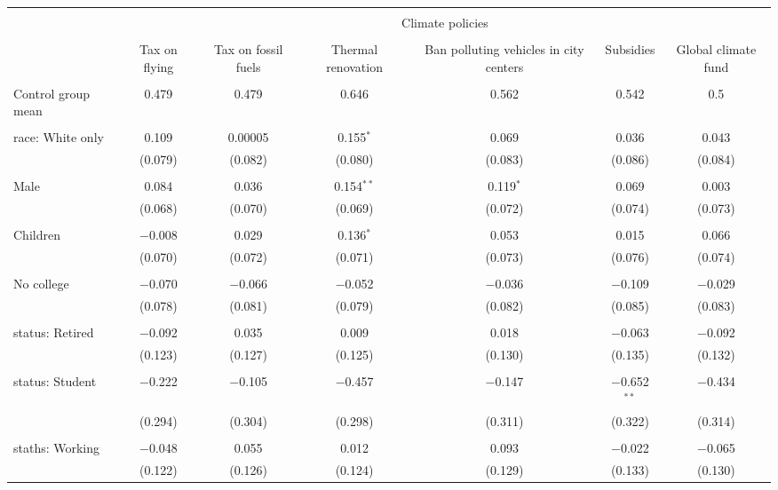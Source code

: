
\begin{tabular}{@{\extracolsep{5pt}}lcccccc} 
\\[-1.8ex]\hline 
\hline \\[-1.8ex] 
 & \multicolumn{6}{c}{Climate policies} \\ 
\cline{2-7} 
\\[-1.8ex] & Tax on flying & Tax on fossil fuels & Thermal renovation & Ban polluting vehicles in city centers & Subsidies & Global climate fund \\ 
\hline \\[-1.8ex] 
 Control group mean & 0.479 & 0.479 & 0.646 & 0.562 & 0.542 & 0.5  \\ \hline \\[-1.8ex] race: White only & 0.109 & 0.00005 & 0.155$^{*}$ & 0.069 & 0.036 & 0.043 \\ 
  & (0.079) & (0.082) & (0.080) & (0.083) & (0.086) & (0.084) \\ 
  & & & & & & \\ 
 Male & 0.084 & 0.036 & 0.154$^{**}$ & 0.119$^{*}$ & 0.069 & 0.003 \\ 
  & (0.068) & (0.070) & (0.069) & (0.072) & (0.074) & (0.073) \\ 
  & & & & & & \\ 
 Children & $-$0.008 & 0.029 & 0.136$^{*}$ & 0.053 & 0.015 & 0.066 \\ 
  & (0.070) & (0.072) & (0.071) & (0.073) & (0.076) & (0.074) \\ 
  & & & & & & \\ 
 No college & $-$0.070 & $-$0.066 & $-$0.052 & $-$0.036 & $-$0.109 & $-$0.029 \\ 
  & (0.078) & (0.081) & (0.079) & (0.082) & (0.085) & (0.083) \\ 
  & & & & & & \\ 
 status: Retired & $-$0.092 & 0.035 & 0.009 & 0.018 & $-$0.063 & $-$0.092 \\ 
  & (0.123) & (0.127) & (0.125) & (0.130) & (0.135) & (0.132) \\ 
  & & & & & & \\ 
 status: Student & $-$0.222 & $-$0.105 & $-$0.457 & $-$0.147 & $-$0.652$^{**}$ & $-$0.434 \\ 
  & (0.294) & (0.304) & (0.298) & (0.311) & (0.322) & (0.314) \\ 
  & & & & & & \\ 
 staths: Working & $-$0.048 & 0.055 & 0.012 & 0.093 & $-$0.022 & $-$0.065 \\ 
  & (0.122) & (0.126) & (0.124) & (0.129) & (0.133) & (0.130) \\ 

\end{tabular}
